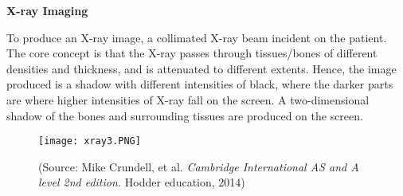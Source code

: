 \documentclass{article}
\begin{document}
\begin{flushleft}
\textbf{X-ray Imaging}
\end{flushleft}

To produce an X-ray image, a collimated X-ray beam incident on the patient. The core concept is that the X-ray passes through tissues/bones of different densities and thickness, and is attenuated to different extents. Hence, the image produced is a shadow with different intensities of black, where the darker parts are where higher intensities of X-ray fall on the screen. A two-dimensional shadow of the bones and surrounding tissues are produced on the screen.

\begin{figure}[H]
    \centering
    \captionsetup{justification=centering,margin=2cm}
    \texttt{[image: xray3.PNG]}
    \caption*{(Source: Mike Crundell, et al. \textit{Cambridge International AS and A level 2nd edition.} Hodder education, 2014)}
\end{figure}
\end{document}
